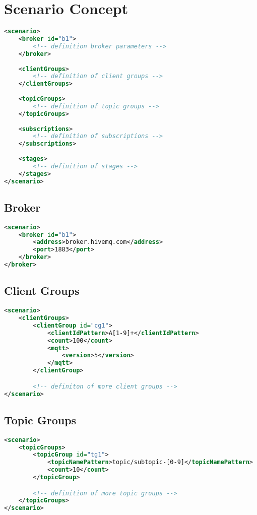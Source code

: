 \chapter{Scenario Concept}



\begin{lstlisting}[caption={XML Definition of the Scenario}, captionpos=b, label={lst:scenario}, language=XML]
<scenario>
	<broker id="b1">
		<!-- definition broker parameters -->
	</broker>
	
	<clientGroups>
		<!-- definition of client groups -->
	</clientGroups>
	
	<topicGroups>
		<!-- definition of topic groups -->
	</topicGroups>
	
	<subscriptions>
		<!-- definition of subscriptions -->
	</subscriptions>
	
	<stages>
		<!-- definition of stages -->
	</stages>
</scenario>
\end{lstlisting}

\section{Broker}
\begin{lstlisting}[caption={XML definition of the Broker}, captionpos=b, label={lst:broker}, language=XML]
<scenario>
	<broker id="b1">
		<address>broker.hivemq.com</address>
		<port>1883</port>
	</broker>
</broker>
\end{lstlisting}

\section{Client Groups}
\begin{lstlisting}[caption={XML defininition of Client Groups}, captionpos=b, label={lst:clientGroups}, language=XML]
<scenario>
	<clientGroups>
		<clientGroup id="cg1">
			<clientIdPattern>A[1-9]+</clientIdPattern>
			<count>100</count>
			<mqtt>
				<version>5</version>
			</mqtt>
		</clientGroup>

		<!-- definiton of more client groups -->
</scenario>
\end{lstlisting}

\section{Topic Groups}
\begin{lstlisting}[caption={XMl definition of Topic Groups}, captionpos=b, label={lst:topicGroups}, language=XML]
<scenario>
	<topicGroups>
		<topicGroup id="tg1">
			<topicNamePattern>topic/subtopic-[0-9]</topicNamePattern>
			<count>10</count>
		</topicGroup>

		<!-- definition of more topic groups -->
	</topicGroups>
</scenario>
\end{lstlisting}

